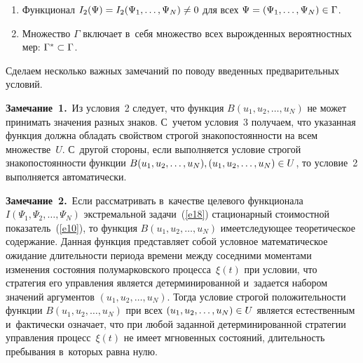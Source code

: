 \begin{multicols}{2}
\begin{enumerate}[1.]
\item Функционал $I_2(\Psi)=I_2(\Psi_1, \ldots,\Psi_N)\hm\neq 0$ 
для всех $\Psi\hm=(\Psi_1, \ldots,\Psi_N)\hm\in \Gamma$.

\item Множество $\Gamma$ включает в~себя множество всех вырожденных 
вероятностных мер: $\Gamma^* \hm\subset \Gamma$.
\end{enumerate}

Сделаем несколько важных замечаний по поводу введенных предварительных условий.

\smallskip

\noindent
\textbf{Замечание~1.}\ Из условия~2 следует, что функция $B(u_1, u_2,\ldots, u_N)$ 
не может принимать значения разных знаков. С~учетом условия~3 
получаем, что указанная функция должна обладать \mbox{свойством} строгой 
знакопостоянности на всем множестве~$U$. С~другой стороны, если выполняется 
условие строгой знакопостоянности функции $B(u_1, u_2,\ldots, u_N), 
(u_1, u_2,\ldots, u_N)\hm\in U$, то условие~2 выполняется автоматически.

\smallskip

\noindent
\textbf{Замечание~2.}\ Если рассматривать в~качестве целевого функционала 
$I(\Psi_1, \Psi_2,\ldots,\Psi_N)$ экстремальной задачи~(\ref{e18}) 
стационарный стоимостной пока\-затель~(\ref{e10}), то функция $B(u_1,u_2,\ldots,u_N)$ 
имеет\linebreak следующее теоретическое содержание. Данная функция представляет собой условное 
математическое ожидание длительности периода времени между соседними моментами 
изменения со\-сто\-яния полумарковского процесса~$\xi(t)$ при условии, что стратегия 
его управ\-ле\-ния является детерминированной и~задается набором значений аргументов 
$(u_1,u_2,\ldots,u_N)$. Тогда условие строгой положительности функции 
$B(u_1,u_2,\ldots,u_N)$ при всех $(u_1,u_2,\ldots,u_N)\hm\in U$ является естественным 
и~фактически означает, что при любой заданной детерминированной стратегии 
управ\-ле\-ния процесс~$\xi(t)$ не имеет мгновенных со\-сто\-яний, длительность пребывания 
в~которых равна нулю.

\smallskip


\end{multicols}
